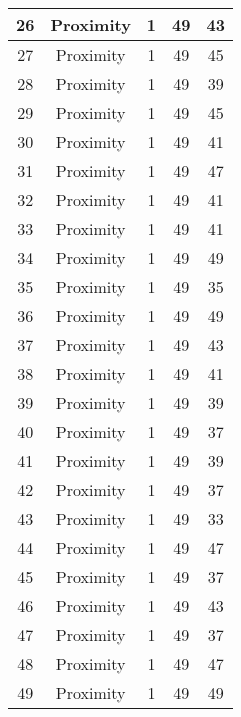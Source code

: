 \documentclass[results.tex]{subfiles}
\begin{document}
\begin{center}
\begin{tabular}{| c || c | c | c | c |}
    \hline
    26 & Proximity & 1 & 49 & 43 \\ 
    \hline
    27 & Proximity & 1 & 49 & 45 \\ 
    \hline
    28 & Proximity & 1 & 49 & 39 \\ 
    \hline
    29 & Proximity & 1 & 49 & 45 \\ 
    \hline
    30 & Proximity & 1 & 49 & 41 \\ 
    \hline
    31 & Proximity & 1 & 49 & 47 \\ 
    \hline
    32 & Proximity & 1 & 49 & 41 \\ 
    \hline
    33 & Proximity & 1 & 49 & 41 \\ 
    \hline
    34 & Proximity & 1 & 49 & 49 \\ 
    \hline
    35 & Proximity & 1 & 49 & 35 \\ 
    \hline
    36 & Proximity & 1 & 49 & 49 \\ 
    \hline
    37 & Proximity & 1 & 49 & 43 \\ 
    \hline
    38 & Proximity & 1 & 49 & 41 \\ 
    \hline
    39 & Proximity & 1 & 49 & 39 \\ 
    \hline
    40 & Proximity & 1 & 49 & 37 \\ 
    \hline
    41 & Proximity & 1 & 49 & 39 \\ 
    \hline
    42 & Proximity & 1 & 49 & 37 \\ 
    \hline
    43 & Proximity & 1 & 49 & 33 \\ 
    \hline
    44 & Proximity & 1 & 49 & 47 \\ 
    \hline
    45 & Proximity & 1 & 49 & 37 \\ 
    \hline
    46 & Proximity & 1 & 49 & 43 \\ 
    \hline
    47 & Proximity & 1 & 49 & 37 \\ 
    \hline
    48 & Proximity & 1 & 49 & 47 \\ 
    \hline
    49 & Proximity & 1 & 49 & 49 \\ 
    \hline   \end{tabular}
\end{center}
\end{document}
